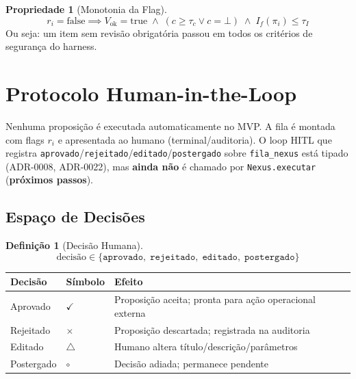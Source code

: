 \documentclass[a4paper, 12pt]{report}
\theoremstyle{definition}
\newtheorem{definicao}{Defini\c{c}\~ao}[chapter]
\newtheorem{propriedade}{Propriedade}[chapter]
\theoremstyle{remark}
\begin{document}
\begin{propriedade}[Monotonia da Flag]
  \[
    r_i = \text{false} \implies
    V_{\text{ok}} = \text{true} \;\land\;
    (c \geq \tau_c \lor c = \bot) \;\land\;
    I_f(\pi_i) \leq \tau_I
  \]
  Ou seja: um item sem revis\~ao obrigat\'oria passou em todos os
  crit\'erios de seguran\c{c}a do harness.
\end{propriedade}


\section{Protocolo Human-in-the-Loop}

\begin{caixaguardrail}
  Nenhuma proposi\c{c}\~ao \'e executada automaticamente no MVP.
  A fila \'e montada com flags $r_i$ e apresentada ao humano
  (terminal/auditoria). O loop HITL que registra
  \texttt{aprovado}/\texttt{rejeitado}/\texttt{editado}/\texttt{postergado}
  sobre \texttt{fila\_nexus} est\'a tipado (ADR-0008, ADR-0022), mas
  \textbf{ainda n\~ao} \'e chamado por \texttt{Nexus.executar}
  (\textbf{pr\'oximos passos}).
\end{caixaguardrail}

\subsection{Espa\c{c}o de Decis\~oes}

\begin{definicao}[Decis\~ao Humana]
  \[
    \text{decis\~ao} \in \{
      \texttt{aprovado},\;
      \texttt{rejeitado},\;
      \texttt{editado},\;
      \texttt{postergado}
    \}
  \]
\end{definicao}

\begin{center}
\begin{tabular}{llp{5.5cm}}
  \toprule
  \textbf{Decis\~ao} & \textbf{S\'imbolo} & \textbf{Efeito} \\
  \midrule
  Aprovado & $\checkmark$ & Proposi\c{c}\~ao aceita; pronta para a\c{c}\~ao operacional externa \\
  Rejeitado & $\times$ & Proposi\c{c}\~ao descartada; registrada na auditoria \\
  Editado & $\triangle$ & Humano altera t\'itulo/descri\c{c}\~ao/par\^ametros \\
  Postergado & $\circ$ & Decis\~ao adiada; permanece pendente \\
  \bottomrule
\end{tabular}
\end{center}
\end{document}
